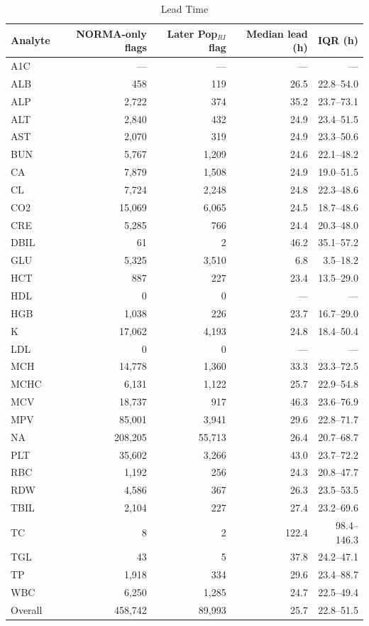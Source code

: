 \begin{table}[ht]
\centering
\footnotesize
\begin{tabular}{lrrrr}
\toprule
Analyte & NORMA-only flags & Later Pop$_{RI}$ flag & Median lead (h) & IQR (h) \\
\midrule
A1C & --- & --- & --- & --- \\
ALB & 458 & 119 & 26.5 & 22.8--54.0 \\
ALP & 2,722 & 374 & 35.2 & 23.7--73.1 \\
ALT & 2,840 & 432 & 24.9 & 23.4--51.5 \\
AST & 2,070 & 319 & 24.9 & 23.3--50.6 \\
BUN & 5,767 & 1,209 & 24.6 & 22.1--48.2 \\
CA & 7,879 & 1,508 & 24.9 & 19.0--51.5 \\
CL & 7,724 & 2,248 & 24.8 & 22.3--48.6 \\
CO2 & 15,069 & 6,065 & 24.5 & 18.7--48.6 \\
CRE & 5,285 & 766 & 24.4 & 20.3--48.0 \\
DBIL & 61 & 2 & 46.2 & 35.1--57.2 \\
GLU & 5,325 & 3,510 & 6.8 & 3.5--18.2 \\
HCT & 887 & 227 & 23.4 & 13.5--29.0 \\
HDL & 0 & 0 & --- & --- \\
HGB & 1,038 & 226 & 23.7 & 16.7--29.0 \\
K & 17,062 & 4,193 & 24.8 & 18.4--50.4 \\
LDL & 0 & 0 & --- & --- \\
MCH & 14,778 & 1,360 & 33.3 & 23.3--72.5 \\
MCHC & 6,131 & 1,122 & 25.7 & 22.9--54.8 \\
MCV & 18,737 & 917 & 46.3 & 23.6--76.9 \\
MPV & 85,001 & 3,941 & 29.6 & 22.8--71.7 \\
NA & 208,205 & 55,713 & 26.4 & 20.7--68.7 \\
PLT & 35,602 & 3,266 & 43.0 & 23.7--72.2 \\
RBC & 1,192 & 256 & 24.3 & 20.8--47.7 \\
RDW & 4,586 & 367 & 26.3 & 23.5--53.5 \\
TBIL & 2,104 & 227 & 27.4 & 23.2--69.6 \\
TC & 8 & 2 & 122.4 & 98.4--146.3 \\
TGL & 43 & 5 & 37.8 & 24.2--47.1 \\
TP & 1,918 & 334 & 29.6 & 23.4--88.7 \\
WBC & 6,250 & 1,285 & 24.7 & 22.5--49.4 \\
Overall & 458,742 & 89,993 & 25.7 & 22.8--51.5 \\
\bottomrule
\end{tabular}
\caption{Lead Time}
\label{tab:lead_time}
\end{table}